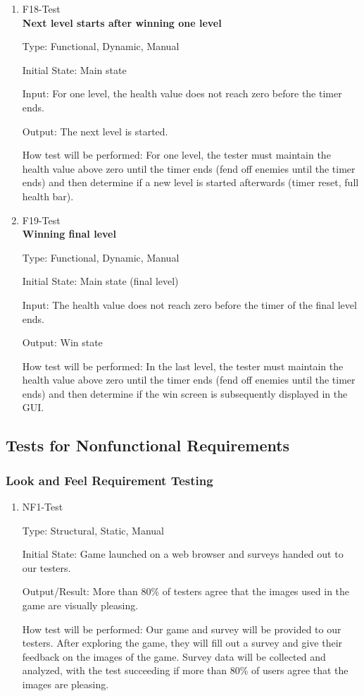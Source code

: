 \documentclass[12pt, titlepage]{article}
\begin{document}
\begin{enumerate}
\item{F18-Test} \\
\textbf{Next level starts after winning one level}

Type: Functional, Dynamic, Manual
					
Initial State: Main state
					
Input: For one level, the health value does not reach zero before the timer ends.
					
Output: The next level is started.
					
How test will be performed: For one level, the tester must maintain the health value above zero until the timer ends (fend off enemies until the timer ends) and then determine if a new level is started afterwards (timer reset, full health bar).

\item{F19-Test} \\
\textbf{Winning final level}

Type: Functional, Dynamic, Manual
					
Initial State: Main state (final level)
					
Input: The health value does not reach zero before the timer of the final level ends.
					
Output: Win state
					
How test will be performed: In the last level, the tester must maintain the health value above zero until the timer ends (fend off enemies until the timer ends) and then determine if the win screen is subsequently displayed in the GUI.
\end{enumerate}

\subsection{Tests for Nonfunctional Requirements}

\subsubsection{Look and Feel Requirement Testing}

\begin{enumerate}

\item{NF1-Test\\}

Type: Structural, Static, Manual
					
Initial State: Game launched on a web browser and surveys handed out to our testers.
					
Output/Result: More than 80\% of testers agree that the images used in the game are visually pleasing.
					
How test will be performed: Our game and survey will be provided to our testers. After exploring the game, they will fill out a survey and give their feedback on the images of the game. Survey data will be collected and analyzed, with the test succeeding if more than 80\% of users agree that the images are pleasing. 

\end{enumerate}
\end{document}
